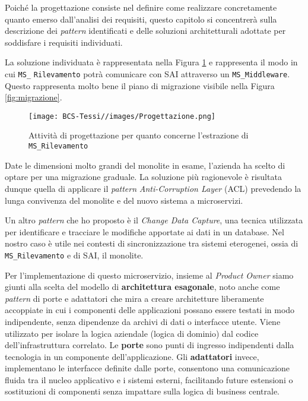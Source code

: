         \vspace{0.2 em}
        \noindent Poiché la progettazione consiste nel definire come realizzare concretamente quanto emerso dall’analisi dei requisiti, questo capitolo si concentrerà sulla descrizione dei \textit{pattern} identificati e delle soluzioni architetturali adottate per soddisfare i requisiti individuati.

        \vspace{0.2 em}
        \noindent La soluzione individuata è rappresentata nella Figura \ref{fig:progettazione} e rappresenta il modo in cui \texttt{MS\_} \texttt{Rilevamento} potrà comunicare con SAI attraverso un \texttt{MS\_Middleware}. Questo rappresenta molto bene il piano di migrazione visibile nella Figura \ref{fig:migrazione}.
        
        \begin{figure}
            \centering
            \texttt{[image: BCS-Tessi//images/Progettazione.png]}
            \caption[Progettazione per l'estrazione del microservizio]{Attività di progettazione per quanto concerne l'estrazione di \texttt{MS\_Rilevamento}}
            \label{fig:progettazione}
        \end{figure}

        \vspace{0.2 em}
        \noindent Date le dimensioni molto grandi del monolite in esame, l'azienda ha scelto di optare per una migrazione graduale. La soluzione più ragionevole è risultata dunque quella di applicare il \textit{pattern} \textit{Anti-Corruption Layer} (ACL) prevedendo la lunga convivenza del monolite e del nuovo sistema a microservizi. 

        \vspace{0.2 em}
        \noindent Un altro \textit{pattern} che ho proposto è il \textit{Change Data Capture}, una tecnica utilizzata per identificare e tracciare le modifiche apportate ai dati in un database. Nel nostro caso è utile nei contesti di sincronizzazione tra sistemi eterogenei, ossia di \texttt{MS\_Rilevamento} e di SAI, il monolite. 

        \vspace{0.2em}
        \noindent Per l'implementazione di questo microservizio, insieme al \textit{Product Owner} siamo giunti alla scelta del modello di \textbf{architettura esagonale}, noto anche come \textit{pattern} di porte e adattatori che mira a creare architetture liberamente accoppiate in cui i componenti delle applicazioni possano essere testati in modo indipendente, senza dipendenze da archivi di dati o interfacce utente. Viene utilizzato per isolare la logica aziendale (logica di dominio) dal codice dell'infrastruttura correlato. Le \textbf{porte} sono punti di ingresso indipendenti dalla tecnologia in un componente dell'applicazione. Gli \textbf{adattatori} invece, implementano le interfacce definite dalle porte, consentono una comunicazione fluida tra il nucleo applicativo e i sistemi esterni, facilitando future estensioni o sostituzioni di componenti senza impattare sulla logica di business centrale.

